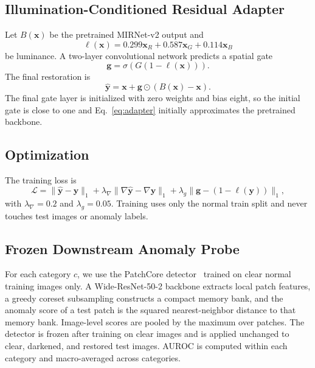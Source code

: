 \documentclass[ASNA,twocolumn]{USG}
\begin{document}
\subsection{Illumination-Conditioned Residual Adapter}
Let $B(\mathbf{x})$ be the pretrained MIRNet-v2 output and
\begin{equation}
\ell(\mathbf{x})=0.299\mathbf{x}_R+0.587\mathbf{x}_G+0.114\mathbf{x}_B
\end{equation}
be luminance. A two-layer convolutional network predicts a spatial gate
\begin{equation}
\mathbf{g}=\sigma\left(G(1-\ell(\mathbf{x}))\right).
\end{equation}
The final restoration is
\begin{equation}
\hat{\mathbf{y}}=\mathbf{x}+\mathbf{g}\odot\left(B(\mathbf{x})-\mathbf{x}\right).
\label{eq:adapter}
\end{equation}
The final gate layer is initialized with zero weights and bias eight, so the initial gate is close to one
and Eq.~\eqref{eq:adapter} initially approximates the pretrained backbone.

\subsection{Optimization}
The training loss is
\begin{equation}
\mathcal{L}=\lVert\hat{\mathbf{y}}-\mathbf{y}\rVert_1+\lambda_{\nabla}\lVert\nabla\hat{\mathbf{y}}-\nabla\mathbf{y}\rVert_1+\lambda_g\lVert\mathbf{g}-(1-\ell(\mathbf{y}))\rVert_1,
\end{equation}
with $\lambda_{\nabla}=0.2$ and $\lambda_g=0.05$. Training uses only the normal train split and never
touches test images or anomaly labels.

\subsection{Frozen Downstream Anomaly Probe}
For each category $c$, we use the PatchCore detector~\cite{roth2022patchcore} trained on clear normal
training images only. A Wide-ResNet-50-2 backbone extracts local patch features, a greedy coreset
subsampling constructs a compact memory bank, and the anomaly score of a test patch is the squared
nearest-neighbor distance to that memory bank. Image-level scores are pooled by the maximum over patches.
The detector is frozen after training on clear images and is applied unchanged to clear, darkened, and
restored test images. AUROC is computed within each category and macro-averaged across categories.
\end{document}
